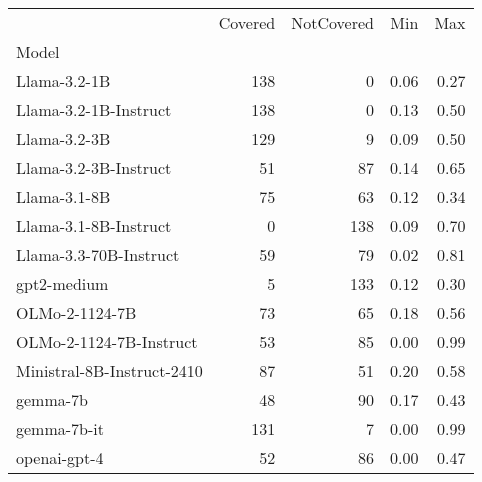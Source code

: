 \begin{tabular}{lrrrr}
\toprule
 & Covered & NotCovered & Min & Max \\
Model &  &  &  &  \\
\midrule
Llama-3.2-1B & 138 & 0 & 0.06 & 0.27 \\
Llama-3.2-1B-Instruct & 138 & 0 & 0.13 & 0.50 \\
Llama-3.2-3B & 129 & 9 & 0.09 & 0.50 \\
Llama-3.2-3B-Instruct & 51 & 87 & 0.14 & 0.65 \\
Llama-3.1-8B & 75 & 63 & 0.12 & 0.34 \\
Llama-3.1-8B-Instruct & 0 & 138 & 0.09 & 0.70 \\
Llama-3.3-70B-Instruct & 59 & 79 & 0.02 & 0.81 \\
gpt2-medium & 5 & 133 & 0.12 & 0.30 \\
OLMo-2-1124-7B & 73 & 65 & 0.18 & 0.56 \\
OLMo-2-1124-7B-Instruct & 53 & 85 & 0.00 & 0.99 \\
Ministral-8B-Instruct-2410 & 87 & 51 & 0.20 & 0.58 \\
gemma-7b & 48 & 90 & 0.17 & 0.43 \\
gemma-7b-it & 131 & 7 & 0.00 & 0.99 \\
openai-gpt-4 & 52 & 86 & 0.00 & 0.47 \\
\bottomrule
\end{tabular}
